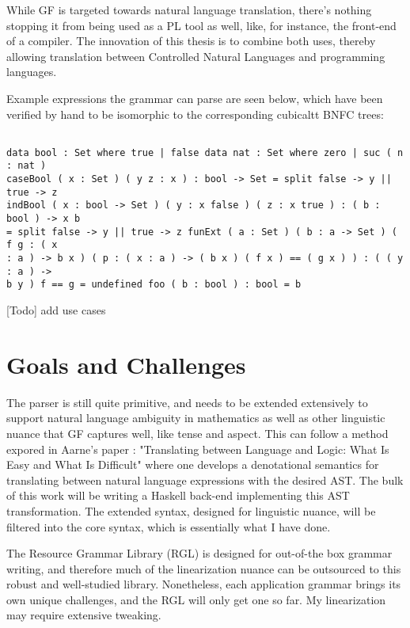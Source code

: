 \documentclass[11pt, a4paper]{article}
\begin{document}
While GF is targeted towards natural language translation, there's nothing
stopping it from being used as a PL tool as well, like, for instance, the
front-end of a compiler. The innovation of this thesis is to combine both uses,
thereby allowing translation between Controlled Natural Languages and
programming languages.

Example expressions the grammar can parse are seen below, which have been
verified by hand to be isomorphic to the corresponding cubicaltt BNFC trees:

\begin{verbatim}

data bool : Set where true | false data nat : Set where zero | suc ( n : nat )
caseBool ( x : Set ) ( y z : x ) : bool -> Set = split false -> y || true -> z
indBool ( x : bool -> Set ) ( y : x false ) ( z : x true ) : ( b : bool ) -> x b
= split false -> y || true -> z funExt ( a : Set ) ( b : a -> Set ) ( f g : ( x
: a ) -> b x ) ( p : ( x : a ) -> ( b x ) ( f x ) == ( g x ) ) : ( ( y : a ) ->
b y ) f == g = undefined foo ( b : bool ) : bool = b

\end{verbatim}

[Todo] add use cases

\section{Goals and Challenges}

The parser is still quite primitive, and needs to be extended extensively to
support natural language ambiguity in mathematics as well as other linguistic
nuance that GF captures well, like tense and aspect. This can follow a method
expored in Aarne's paper : "Translating between Language and Logic: What Is Easy
and What Is Difficult" where one develops a denotational semantics for
translating between natural language expressions with the desired AST. The bulk
of this work will be writing a Haskell back-end implementing this AST
transformation. The extended syntax, designed for linguistic nuance, will be
filtered into the core syntax, which is essentially what I have done.

The Resource Grammar Library (RGL) is designed for out-of-the box grammar
writing, and therefore much of the linearization nuance can be outsourced to
this robust and well-studied library. Nonetheless, each application grammar
brings its own unique challenges, and the RGL will only get one so far. My
linearization may require extensive tweaking.
\end{document}
